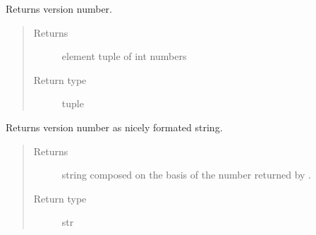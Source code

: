 \documentclass[a4paper,10pt,english]{sphinxmanual}
\begin{document}
\begin{fulllineitems}
\label{aqueduct:aqueduct.version}
Returns {\hyperref[aqueduct:module-aqueduct]{}} version number.
\begin{quote}\begin{description}
\item[{Returns}]  element tuple of int numbers

\item[{Return type}] \leavevmode
tuple

\end{description}\end{quote}

\end{fulllineitems}


\begin{fulllineitems}
\label{aqueduct:aqueduct.version_nice}
Returns {\hyperref[aqueduct:module-aqueduct]{}} version number as nicely formated string.
\begin{quote}\begin{description}
\item[{Returns}] \leavevmode
string composed on the basis of the number returned by {\hyperref[aqueduct:aqueduct.version]{}}.

\item[{Return type}] \leavevmode
str

\end{description}\end{quote}

\end{fulllineitems}

\end{document}
